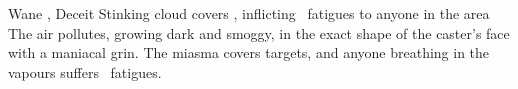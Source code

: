   {\mWater}%
  {Wane}%
  {\detailed, \duplicated}%
  {Deceit}%
  {Stinking cloud covers \spellArea, inflicting ~\glspl{fatigue} to anyone in the area}%
  {
    The air pollutes, growing dark and smoggy, in the exact shape of the caster's face with a maniacal grin.
    The miasma covers \spellArea targets, and anyone breathing in the vapours suffers ~\glspl{fatigue}.
  }


